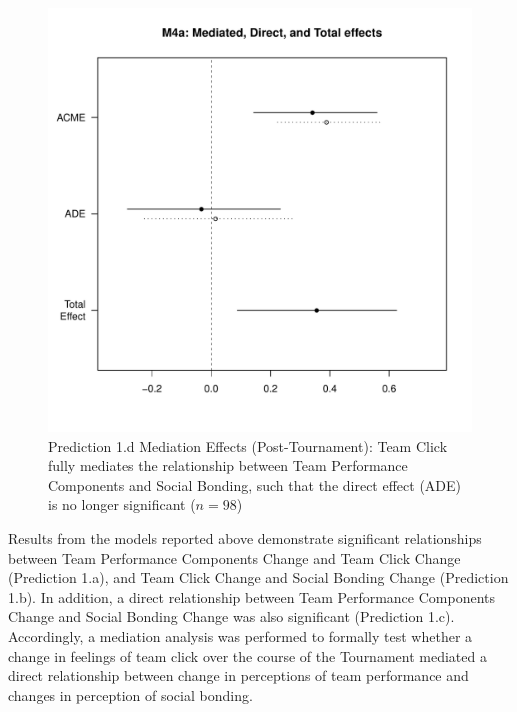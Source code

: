 \begin{CJK}{UTF8}{gbsn}
  \begin{figure}[htbp]
    \centering
    \includegraphics[scale = .5]{images/MLM4aMediationEffectsOffline1}
    \caption{Prediction 1.d Mediation Effects (Post-Tournament): Team Click fully mediates the relationship between Team Performance Components and Social Bonding, such that the direct effect (ADE) is no longer significant ($n = 98$)}
    \label{fig:MLM4aMediationAnalysis}
  \end{figure}




  Results from the models reported above demonstrate significant relationships between Team Performance Components Change and Team Click Change (Prediction 1.a), and Team Click Change and Social Bonding Change (Prediction 1.b).  In addition, a direct relationship between Team Performance Components Change and Social Bonding Change was also significant (Prediction 1.c).  Accordingly, a mediation analysis was performed to formally test whether a change in feelings of team click over the course of the Tournament mediated a direct relationship between change in perceptions of team performance and changes in perception of social bonding.\\


\end{CJK}
